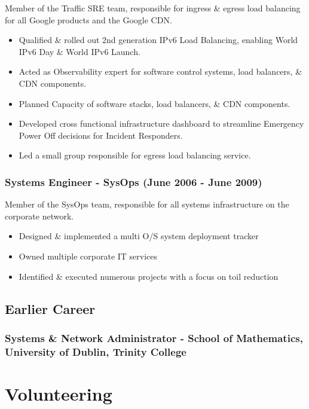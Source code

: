 \documentclass[a4paper, 10pt] {article}
\begin{document}
Member of the Traffic SRE team, responsible for ingress \& egress load
balancing for all Google products and the Google CDN. 

\begin{itemize}[noitemsep]
  \item Qualified \& rolled out 2nd generation IPv6 Load Balancing, enabling World IPv6 Day \& World IPv6 Launch.
	\item Acted as Observability expert for software control systems, load balancers, \& CDN components.
	\item Planned Capacity of software stacks, load balancers, \& CDN components.
	\item Developed cross functional infrastructure dashboard to streamline Emergency Power Off decisions for Incident Responders.
	\item Led a small group responsible for egress load balancing service.
\end{itemize}

\subsubsection*{Systems Engineer - SysOps (June 2006 - June 2009)}

Member of the SysOps team, responsible for all systems infrastructure on
the corporate network.

\begin{itemize}[noitemsep]
	\item Designed \& implemented a multi O/S system deployment tracker
	\item Owned multiple corporate IT services
	\item Identified \& executed numerous projects with a focus on toil reduction
\end{itemize}

\subsection*{Earlier Career}

\subsubsection*{Systems \& Network Administrator - School of Mathematics, University of Dublin, Trinity College}

\hrulefill

\section*{Volunteering}
\end{document}
